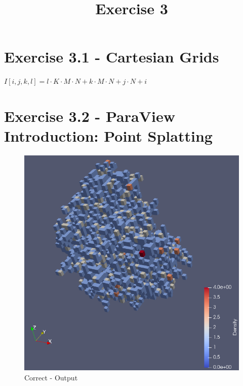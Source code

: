 \documentclass[a4paper]{article}
\date{}
\author{}
\title{Exercise 3}
\begin{document}
	
	\maketitle
	\thispagestyle{fancy}
	
	\section*{Exercise 3.1 - Cartesian Grids}
	$I[i, j, k, l] = l\cdot K \cdot M \cdot N  + k \cdot M \cdot N  + j \cdot N + i$
	
	\section*{Exercise 3.2 - ParaView Introduction: Point Splatting}
	
	\begin{figure}[!ht]
		\centering
		\includegraphics[width=0.7\linewidth]{paraview}
		\caption{Correct - Output}
		\label{fig:paraview}
	\end{figure}
	
	
	
\end{document}
